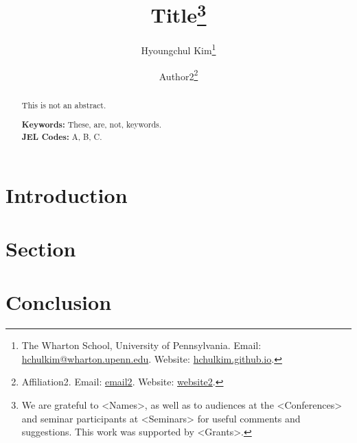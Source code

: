 \documentclass[12pt]{article}
\begin{document}
\title{Title\thanks{
We are grateful to <Names>, as well as to audiences at the <Conferences> and seminar participants at <Seminars> for useful comments and suggestions. 
This work was supported by <Grants>.
}}
\author{Hyoungchul Kim\thanks{The Wharton School, University of Pennsylvania. Email: \href{mailto:hchulkim@wharton.upenn.edu}{hchulkim@wharton.upenn.edu}. Website: \href{hchulkim.github.io}{hchulkim.github.io}.}
\and
Author2\thanks{Affiliation2. Email: \href{mailto:email2}{email2}. Website: \href{website1}{website2}.}}

\begin{titlepage}
\maketitle

\begin{abstract}
\noindent This is not an abstract.

\vspace{1em}
\noindent\textbf{Keywords:} These, are, not, keywords.\\
\noindent\textbf{JEL Codes:} A, B, C.
\end{abstract}

\setcounter{page}{0}
\thispagestyle{empty}
\end{titlepage}

\pagebreak

\onehalfspacing %

\section{Introduction}\label{sec:introduction}


\section{Section} \label{sec:section}


\section{Conclusion} \label{sec:conclusion}


% 
\end{document}
